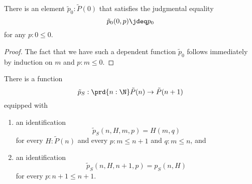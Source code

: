 \begin{lem}
  There is an element $\tilde{p}_0:\tilde{P}(0)$ that satisfies the judgmental equality
  \begin{equation*}
    \tilde{p}_0(0,p)\jdeq p_0
  \end{equation*}
  for any $p:0\leq 0$.
\end{lem}

\begin{proof}
  The fact that we have such a dependent function $\tilde{p}_0$ follows immediately by induction on $m$ and $p:m\leq 0$.
\end{proof}

\begin{lem}\label{lem:succ-strong-ind-N}
  There is a function
  \begin{equation*}
    \tilde{p}_S : \prd{n:\N}\tilde{P}(n)\to\tilde{P}(n+1)
  \end{equation*}
  equipped with
  \begin{enumerate}
  \item an identification
    \begin{equation*}
      \tilde{p}_S(n,H,m,p) = H(m,q)
    \end{equation*}
    for every $H:\tilde{P}(n)$ and every $p:m\leq n+1$ and $q:m\leq n$, and
  \item an identification
    \begin{equation*}
      \tilde{p}_S(n,H,n+1,p) = p_S(n,H)
    \end{equation*}
    for every $p:n+1\leq n+1$.
  \end{enumerate}
\end{lem}

